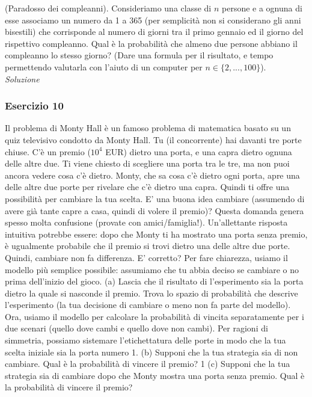 (Paradosso dei compleanni). Consideriamo una classe di $n$ persone e a ognuna di esse associamo un numero da 1 a 365 (per semplicità non si considerano gli anni bisestili) che corrisponde al numero di giorni tra il primo gennaio ed il giorno del rispettivo compleanno. Qual è la probabilità che almeno due persone abbiano il compleanno lo stesso giorno? (Dare una formula per il risultato, e tempo permettendo valutarla con l’aiuto di un computer per $n \in \{2, . . . , 100\}$).
\\

\textit{Soluzione} \quad 

\subsubsection{Esercizio 10}
Il problema di Monty Hall è un famoso problema di matematica basato su un quiz televisivo condotto da Monty Hall. Tu (il concorrente) hai davanti tre porte chiuse. C’è un premio ($10^4$ EUR) dietro una porta, e una capra dietro ognuna delle altre due. Ti viene chiesto di scegliere una porta tra le tre, ma non puoi ancora vedere cosa c’è dietro. Monty, che sa cosa c’è dietro ogni porta, apre una delle altre due porte per rivelare che c’è dietro una capra. Quindi ti offre una possibilità per cambiare la tua scelta. E' una buona idea cambiare (assumendo di avere già tante capre a casa, quindi di volere il premio)? Questa domanda genera spesso molta confusione (provate con amici/famiglia!). Un’allettante risposta intuitiva potrebbe essere: dopo che Monty ti ha mostrato una porta senza premio, è ugualmente probabile che il premio si trovi dietro una delle altre due porte. Quindi, cambiare non fa differenza. E' corretto?
Per fare chiarezza, usiamo il modello più semplice possibile: assumiamo che tu abbia deciso se cambiare o no prima dell’inizio del gioco.
(a) Lascia che il risultato di l’esperimento sia la porta dietro la quale si nasconde il premio. Trova lo spazio di probabilità che descrive l’esperimento (la tua decisione di cambiare o meno non fa parte del modello).
Ora, usiamo il modello per calcolare la probabilità di vincita separatamente per i due scenari (quello dove cambi e quello dove non cambi). Per ragioni di simmetria, possiamo sistemare l’etichettatura delle porte in modo che la tua scelta iniziale sia la porta numero 1.
(b) Supponi che la tua strategia sia di non cambiare. Qual è la probabilità di vincere il premio? 1 (c) Supponi che la tua strategia sia di cambiare dopo che Monty mostra una porta senza premio.
Qual è la probabilità di vincere il premio?
\\

